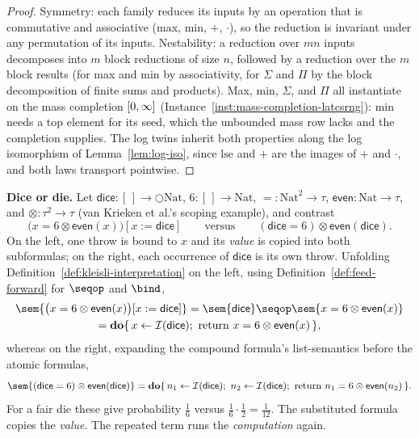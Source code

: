 \begin{proof}
\leanok
Symmetry: each family reduces its inputs by an operation that is
commutative and associative (max, min, $+$, $\cdot$), so the reduction is
invariant under any permutation of its inputs. Nestability: a reduction
over $mn$ inputs decomposes into $m$ block reductions of size $n$,
followed by a reduction over the $m$ block results (for max and min by
associativity, for $\Sigma$ and $\Pi$ by the block decomposition of
finite sums and products). Max, min, $\Sigma$, and $\Pi$ all instantiate
on the mass completion $[0,\infty]$ (Instance~\ref{inst:mass-completion-latcsrng}):
min needs a top element for its seed, which the unbounded mass row lacks
and the completion supplies. The log twins inherit both properties along
the log isomorphism of Lemma~\ref{lem:log-iso}, since $\mathrm{lse}$ and
$+$ are the images of $+$ and $\cdot$, and both laws transport
pointwise.
\end{proof}

\textbf{Dice or die.} Let $\mathsf{dice} \colon [\,] \to \bigcirc\mathrm{Nat}$,
$6 \colon [\,] \to \mathrm{Nat}$, ${=} \colon \mathrm{Nat}^2 \to \tau$,
$\mathsf{even} \colon \mathrm{Nat} \to \tau$, and
$\otimes \colon \tau^2 \to \tau$ (van Krieken et al.'s scoping example),
and contrast
\[
  \bigl(x = 6 \otimes \mathsf{even}(x)\bigr)[x := \mathsf{dice}]
  \qquad\text{versus}\qquad
  (\mathsf{dice} = 6) \otimes \mathsf{even}(\mathsf{dice}).
\]
On the left, one throw is bound to $x$ and its \emph{value} is copied
into both subformulas; on the right, each occurrence of $\mathsf{dice}$
is its own throw. Unfolding Definition~\ref{def:kleisli-interpretation}
on the left, using Definition~\ref{def:feed-forward} for
$\seqop$ and $\bind$,
\begin{multline*}
  \sem{\bigl(x=6\otimes\mathsf{even}(x)\bigr)[x:=\mathsf{dice}]}
  = \sem{\mathsf{dice}} \seqop \sem{x=6\otimes\mathsf{even}(x)} \\
  = \Do\{\, x \leftarrow \mathcal I(\mathsf{dice});\ \Ret\ x=6 \otimes \mathsf{even}(x) \,\},
\end{multline*}
whereas on the right, expanding the compound formula's list-semantics
before the atomic formulas,
\[
  \sem{(\mathsf{dice}=6)\otimes\mathsf{even}(\mathsf{dice})}
  = \Do\{\, n_1 \leftarrow \mathcal I(\mathsf{dice});\ n_2 \leftarrow
  \mathcal I(\mathsf{dice});\ \Ret\ n_1=6\otimes\mathsf{even}(n_2) \,\}.
\]
For a fair die these give probability $\tfrac16$ versus
$\tfrac16\cdot\tfrac12=\tfrac1{12}$. The substituted formula copies the
\emph{value}. The repeated term runs the \emph{computation} again.


